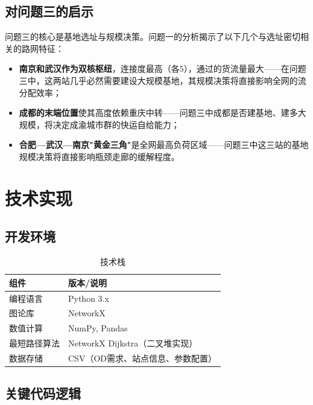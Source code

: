 \documentclass[12pt,a4paper,fontset=none]{ctexart}
\begin{document}
\subsection{对问题三的启示}

问题三的核心是基地选址与规模决策。问题一的分析揭示了以下几个与选址密切相关的路网特征：

\begin{itemize}
    \item \textbf{南京和武汉作为双核枢纽}，连接度最高（各5），通过的货流量最大——在问题三中，这两站几乎必然需要建设大规模基地，其规模决策将直接影响全网的流分配效率；
    \item \textbf{成都的末端位置}使其高度依赖重庆中转——问题三中成都是否建基地、建多大规模，将决定成渝城市群的快运自给能力；
    \item \textbf{合肥—武汉—南京"黄金三角"}是全网最高负荷区域——问题三中这三站的基地规模决策将直接影响瓶颈走廊的缓解程度。
\end{itemize}

\section{技术实现}

\subsection{开发环境}

\begin{table}[H]
\centering
\caption{技术栈}
\begin{tabular}{ll}
\toprule
\textbf{组件}  & \textbf{版本/说明} \\
\midrule
编程语言  & Python 3.x \\
图论库    & NetworkX \\
数值计算  & NumPy, Pandas \\
最短路径算法 & NetworkX Dijkstra（二叉堆实现） \\
数据存储  & CSV（OD需求、站点信息、参数配置） \\
\bottomrule
\end{tabular}
\end{table}

\subsection{关键代码逻辑}
\end{document}
